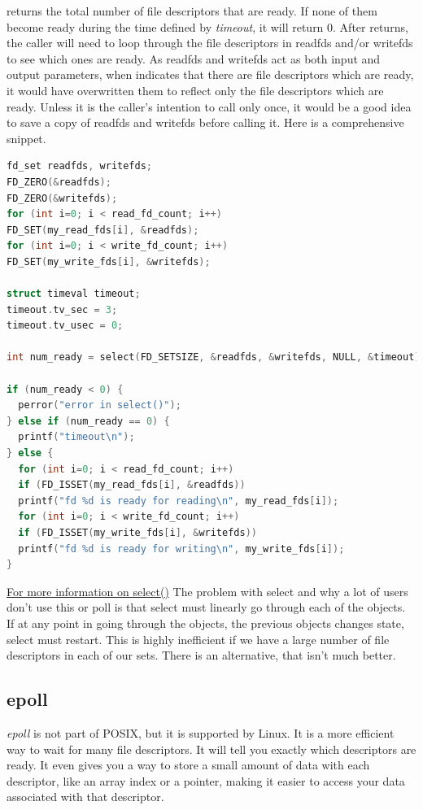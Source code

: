  returns the total number of file descriptors that are ready.
If none of them become ready during the time defined by \emph{timeout}, it will return 0.
After  returns, the caller will need to loop through the file descriptors in readfds and/or writefds to see which ones are ready.
As readfds and writefds act as both input and output parameters, when  indicates that there are file descriptors which are ready, it would have overwritten them to reflect only the file descriptors which are ready.
Unless it is the caller's intention to call  only once, it would be a good idea to save a copy of readfds and writefds before calling it.
Here is a comprehensive snippet.

\begin{lstlisting}[language=C]
fd_set readfds, writefds;
FD_ZERO(&readfds);
FD_ZERO(&writefds);
for (int i=0; i < read_fd_count; i++)
FD_SET(my_read_fds[i], &readfds);
for (int i=0; i < write_fd_count; i++)
FD_SET(my_write_fds[i], &writefds);

struct timeval timeout;
timeout.tv_sec = 3;
timeout.tv_usec = 0;

int num_ready = select(FD_SETSIZE, &readfds, &writefds, NULL, &timeout);

if (num_ready < 0) {
  perror("error in select()");
} else if (num_ready == 0) {
  printf("timeout\n");
} else {
  for (int i=0; i < read_fd_count; i++)
  if (FD_ISSET(my_read_fds[i], &readfds))
  printf("fd %d is ready for reading\n", my_read_fds[i]);
  for (int i=0; i < write_fd_count; i++)
  if (FD_ISSET(my_write_fds[i], &writefds))
  printf("fd %d is ready for writing\n", my_write_fds[i]);
}
\end{lstlisting}

\href{http://pubs.opengroup.org/onlinepubs/9699919799/functions/select.html}{For more information on select()}
The problem with select and why a lot of users don't use this or poll is that select must linearly go through each of the objects.
If at any point in going through the objects, the previous objects changes state, select must restart.
This is highly inefficient if we have a large number of file descriptors in each of our sets.
There is an alternative, that isn't much better.

\subsection{epoll}

\emph{epoll} is not part of POSIX, but it is supported by Linux.
It is a more efficient way to wait for many file descriptors.
It will tell you exactly which descriptors are ready.
It even gives you a way to store a small amount of data with each descriptor, like an array index or a pointer, making it easier to access your data associated with that descriptor.

